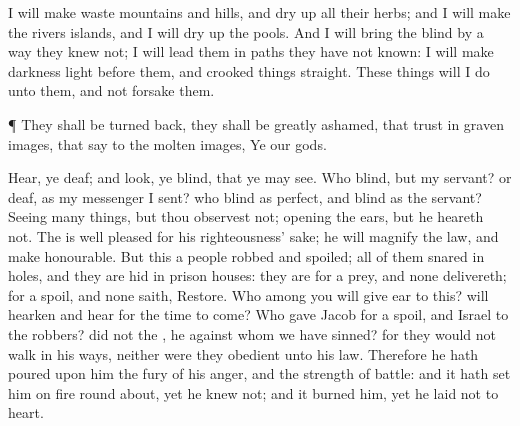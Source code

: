 {I will make
waste
mountains and
hills, and dry
up all their
herbs; and I will
make the
rivers
islands, and I will dry
up the
pools.
And I will
bring the
blind by a
way
{} they
knew not; I will
lead them in
paths
{} they have not
known: I will
make
darkness
light
before them, and crooked
things
straight. These
things will I
do unto them, and not
forsake them.
\par }{\PP {}¶ They shall be
turned
back, they shall be
greatly
ashamed, that
trust in graven
images, that
say to the molten
images, Ye
{} our
gods.
\par }{\PP {}Hear, ye
deaf; and
look, ye
blind, that ye may
see.
Who
{}
blind, but my
servant? or
deaf, as my
messenger
{} I
sent? who
{}
blind as
{}
perfect, and
blind as the
{}
servant?
Seeing many
things, but thou
observest not;
opening the
ears, but he
heareth not.
The
{} is well
pleased for his
righteousness’ sake; he will
magnify the
law, and make
{}
honourable.
But this
{} a
people
robbed and
spoiled;
{} all of them
snared in
holes, and they are
hid in
prison
houses: they are for a
prey, and none
delivereth; for a
spoil, and none
saith,
Restore.
Who among you will give
ear to this?
{} will
hearken and
hear for the time to
come?
Who
gave
Jacob for a
spoil, and
Israel to the
robbers? did not the
{}, he against
whom we have
sinned? for they
would not
walk in his
ways, neither were they
obedient unto his
law.
Therefore he hath
poured upon him the
fury of his
anger, and the
strength of
battle: and it hath set him on
fire round
about, yet he
knew not; and it
burned him, yet he
laid
{} not to
heart.

}
